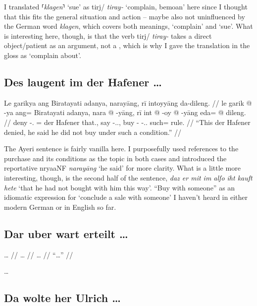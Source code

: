 \documentclass[12pt,paper=a4]{scrartcl}
\newcommand{\fw}[1]{\textit{#1}} %
\newcommand{\norm}[1]{⸢\textit{#1}⸣} %
\newcommand{\ayr}[1]{{\Tagati #1}}
\newcommand{\xayr}[3]{{\Tagati #1} \emph{#2} \enquote*{#3}}
\begin{document}
I translated \norm{klagen} `sue' as \xayr{tirj/}{tiray-}{complain, bemoan} here 
since I thought that this fits the general situation and action -- maybe also 
not uninfluenced by the German word \Nhg{} \fw{klagen}, which covers both 
meanings, `complain' and `sue'. What is interesting here, though, is that the 
verb \ayr{tirj/} \fw{tiray-} takes a direct object/patient \Np{} as an argument, 
not a \Pp{}, which is why I gave the translation in the gloss as `complain 
about'.

\subsection*{Des laugent im der Hafener …}


\ex
\begingl
	\glpreamble Le garikya ang Biratayati adanya, narayāng, rī intoyyāng 
		da-dileng. //
	\gla le garik @ -ya ang= Biratayati adanya, nara @ -yāng, rī int @ 
		-oy @ -yāng eda= @ dileng. //
	\glb \PatT{} deny -\Tsg{}.\M{} \Aarg{}= {der Hafener} that.\Top{}, say 
		-\Tsg{}.\M{}.\Aarg{}, \InsT{} buy -\Neg{} -\Tsg{}.\M{}.\Aarg{} 
		such= rule.\Top{} //
	\glft \enquote{This der Hafener denied, he said he did not buy under 
		such a condition.} //
\endgl \xe

The Ayeri sentence is fairly vanilla here. I purposefully used references to 
the purchase and its conditions as the topic in both cases and introduced the 
reportative \xayr{nryaaNF}{narayāng}{he said} for more clarity. What is a little 
more interesting, though, is the second half of the \Mhg{} sentence,
\fw{daz er mit im alſo iht kauft hete} `that he had not bought with him this 
way'. \enquote{Buy with someone} as an idiomatic expression for `conclude a sale 
with someone' I haven't heard in either modern German or in English so far.

\subsection*{Dar uber wart erteilt …}


\ex \begingl
	\glpreamble … //
	\gla … //
	\glb … //
	\glft \enquote{…} //
\endgl \xe

…

\subsection*{Da wolte her Ulrich …}
\end{document}
